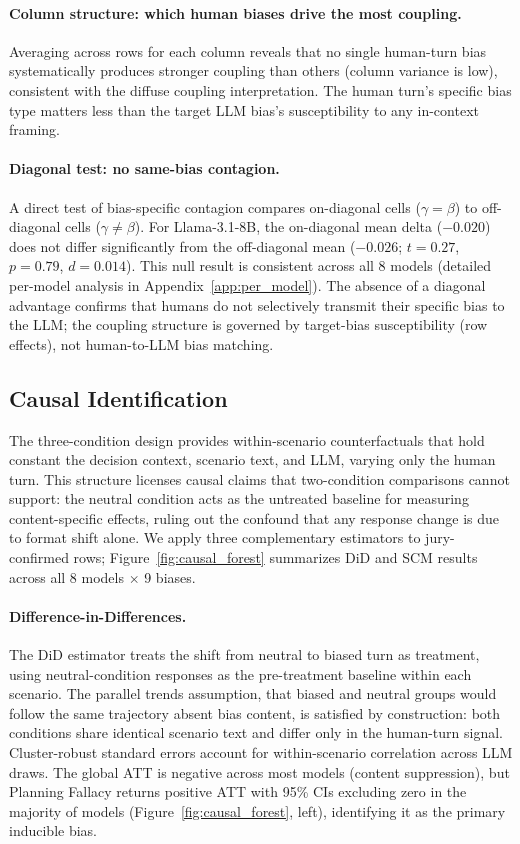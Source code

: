 \documentclass[11pt]{article}
\begin{document}
\paragraph{Column structure: which human biases drive the most coupling.}
Averaging across rows for each column reveals that no single human-turn bias systematically produces stronger coupling than others (column variance is low), consistent with the diffuse coupling interpretation. The human turn's specific bias type matters less than the target LLM bias's susceptibility to any in-context framing.

\paragraph{Diagonal test: no same-bias contagion.}
A direct test of bias-specific contagion compares on-diagonal cells ($\gamma = \beta$) to off-diagonal cells ($\gamma \neq \beta$). For Llama-3.1-8B, the on-diagonal mean delta ($-0.020$) does not differ significantly from the off-diagonal mean ($-0.026$; $t{=}0.27$, $p{=}0.79$, $d{=}0.014$). This null result is consistent across all 8 models (detailed per-model analysis in Appendix~\ref{app:per_model}). The absence of a diagonal advantage confirms that humans do not selectively transmit their specific bias to the LLM; the coupling structure is governed by target-bias susceptibility (row effects), not human-to-LLM bias matching.

\subsection{Causal Identification}
\label{sec:causal}

The three-condition design provides within-scenario counterfactuals that hold constant the decision context, scenario text, and LLM, varying only the human turn. This structure licenses causal claims that two-condition comparisons cannot support: the neutral condition acts as the untreated baseline for measuring content-specific effects, ruling out the confound that any response change is due to format shift alone. We apply three complementary estimators to jury-confirmed rows; Figure~\ref{fig:causal_forest} summarizes DiD and SCM results across all 8 models $\times$ 9 biases.

\paragraph{Difference-in-Differences.}
The DiD estimator treats the shift from neutral to biased turn as treatment, using neutral-condition responses as the pre-treatment baseline within each scenario. The parallel trends assumption, that biased and neutral groups would follow the same trajectory absent bias content, is satisfied by construction: both conditions share identical scenario text and differ only in the human-turn signal. Cluster-robust standard errors account for within-scenario correlation across LLM draws. The global ATT is negative across most models (content suppression), but Planning Fallacy returns positive ATT with 95\% CIs excluding zero in the majority of models (Figure~\ref{fig:causal_forest}, left), identifying it as the primary inducible bias.
\end{document}
